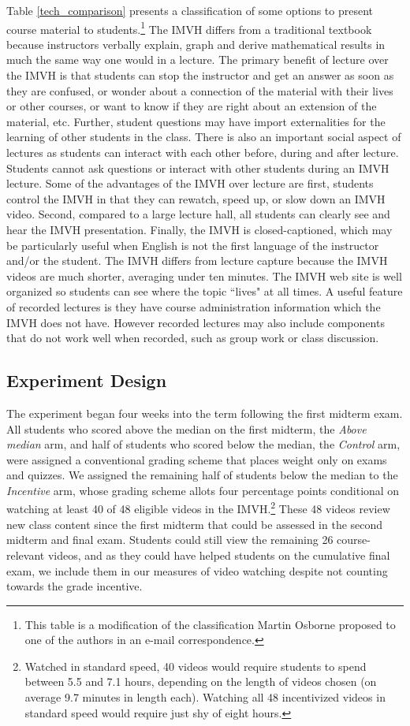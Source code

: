 \documentclass[12pt]{article}
\begin{document}
Table \ref{tech_comparison} presents a classification of some options to present course material to students.\footnote{This table is a modification of the classification Martin Osborne proposed to one of the authors in an e-mail correspondence.} The IMVH differs from a traditional textbook because instructors verbally explain, graph and derive mathematical results in much the same way one would in a lecture. The primary benefit of lecture over the IMVH is that students can stop the instructor and get an answer as soon as they are confused, or wonder about a connection of the material with their lives or other courses, or want to know if they are right about an extension of the material, etc. Further, student questions may have import externalities for the learning of other students in the class. There is also an important social aspect of lectures as students can interact with each other before, during and after lecture. Students cannot ask questions or interact with other students during an IMVH lecture. Some of the advantages of the IMVH over lecture are first, students control the IMVH in that they can rewatch, speed up, or slow down an IMVH video. Second, compared to a large lecture hall, all students can clearly see and hear the IMVH presentation. Finally, the IMVH is closed-captioned, which may be particularly useful when English is not the first language of the instructor and/or the student. The IMVH differs from lecture capture because the IMVH videos are much shorter, averaging under ten minutes. The IMVH web site is well organized so students can see where the topic ``lives" at all times. A useful feature of recorded lectures is they have course administration information which the IMVH does not have. However recorded lectures may also include components that do not work well when recorded, such as group work or class discussion.

\subsection{Experiment Design} \label{expdesign}

The experiment began four weeks into the term following the first midterm exam. All students who scored above the median on the first midterm, the \textit{Above median} arm, and half of students who scored below the median, the \textit{Control} arm, were assigned a conventional grading scheme that places weight only on exams and quizzes. We assigned the remaining half of students below the median to the \textit{Incentive} arm, whose grading scheme allots four percentage points conditional on watching at least 40 of 48 eligible videos in the IMVH.\footnote{Watched in standard speed, 40 videos would require students to spend between 5.5 and 7.1 hours, depending on the length of videos chosen (on average 9.7 minutes in length each). Watching all 48 incentivized videos in standard speed would require just shy of eight hours.} These 48 videos review new class content since the first midterm that could be assessed in the second midterm and final exam. Students could still view the remaining 26 course-relevant videos, and as they could have helped students on the cumulative final exam, we include them in our measures of video watching despite not counting towards the grade incentive.
\end{document}
